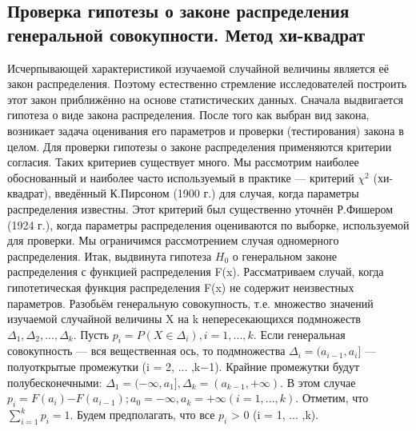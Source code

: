 \documentclass[12pt,a4paper]{scrartcl}
\begin{document}
    \subsection{Проверка гипотезы о законе распределения генеральной совокупности. Метод хи-квадрат}
    Исчерпывающей характеристикой изучаемой случайной величины является её закон распределения. Поэтому естественно стремление исследователей построить этот закон приближённо на основе статистических данных.
    \newline
    Сначала выдвигается гипотеза о виде закона распределения.
    \newline
    После того как выбран вид закона, возникает задача оценивания его параметров и проверки (тестирования) закона в целом.
    \newline
    Для проверки гипотезы о законе распределения применяются критерии согласия. Таких критериев существует много. Мы рассмотрим наиболее обоснованный и наиболее часто используемый в практике — критерий $\chi^{2}$ (хи-квадрат), введённый К.Пирсоном (1900 г.) для случая, когда параметры распределения известны. Этот критерий был существенно уточнён Р.Фишером (1924 г.), когда параметры распределения оцениваются по выборке, используемой для проверки.
    \newline
    Мы ограничимся рассмотрением случая одномерного распределения.
    \newline
    Итак, выдвинута гипотеза $H_{0}$ о генеральном законе распределения с функцией распределения F(x).
    \newline
    Рассматриваем случай, когда гипотетическая функция распределения F(x) не содержит неизвестных параметров.
    \newline
    Разобьём генеральную совокупность, т.е. множество значений изучаемой случайной величины X на k непересекающихся подмножеств $\Delta_{1},\Delta_{2}, ... ,\Delta_{k}$.
    \newline
    Пусть $p_{i} = P(X \in \Delta_{i}), i = 1, ... ,k$. 
    \newline
    Если генеральная совокупность — вся вещественная ось, то подмножества $\Delta_{i} = (a_{i-1},a_{i}]$ — полуоткрытые промежутки (i = 2, ... ,k$-$1). Крайние промежутки будут полубесконечными: $\Delta_{1} = (-\infty,a_{1}], \Delta_{k} = (a_{k-1},+\infty).$ В этом случае $p_{i} = F(a_{i})$$-$$F(a_{i-1}); a_{0} = -\infty, a_{k} = +\infty (i = 1, ... ,k).$
    \newline
    Отметим, что $\sum_{i=1}^{k}{p_{i}} = 1$.
    Будем предполагать, что все $p_{i}$ > 0 (i = 1, ... ,k).
\end{document}
